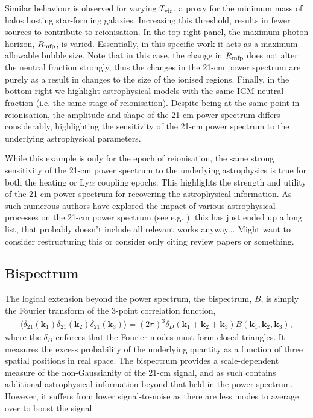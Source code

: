 Similar behaviour is observed for varying $T_{\rm vir}$, a proxy for the minimum mass of halos hosting star-forming galaxies. Increasing this threshold, results in fewer sources to contribute to reionisation. In the top right panel, the maximum photon horizon, $R_{\rm mfp}$, is varied. Essentially, in this specific work it acts as a maximum allowable bubble size. Note that in this case, the change in $R_{\rm mfp}$ does not alter the neutral fraction strongly, thus the changes in the 21-cm power spectrum are purely as a result in changes to the size of the ionised regions. Finally, in the bottom right we highlight astrophysical models with the same IGM neutral fraction (i.e. the same stage of reionisation). Despite being at the same point in reionisation, the amplitude and shape of the 21-cm power spectrum differs considerably, highlighting the sensitivity of the 21-cm power spectrum to the underlying astrophysical parameters. 

While this example is only for the epoch of reionisation, the same strong sensitivity of the 21-cm power spectrum to the underlying astrophysics is true for both the heating or Ly$\alpha$ coupling epochs. This highlights the strength and utility of the 21-cm power spectrum for recovering the astrophysical information. As such numerous authors have explored the impact of various astrophysical processes on the 21-cm power spectrum (see e.g. \cite{Bowman:2006,Furlanetto:2006a,McQuinn:2006,McQuinn:2007,Pritchard:2007,Lidz:2008,Santos:2008,Baek:2010,Harker:2010,Mesinger:2013,Pober:2014,Greig:2015,Mesinger:2016,Greig:2017b,Kern:2017,Hassan:2017,Cohen:2018,Greig:2018,Schmit:2018,Park:2019}). {\color{red} this has just ended up a long list, that probably doesn't include all relevant works anyway... Might want to consider restructuring this or consider only citing review papers or something.}

\subsection{Bispectrum} \label{sec:bispectrum}

The logical extension beyond the power spectrum, the bispectrum, $B$, is simply the Fourier transform of the 3-point correlation function,
\begin{eqnarray}
\langle \delta_{21}(\mathbf{k}_{1})\delta_{21}(\mathbf{k}_{2})\delta_{21}(\mathbf{k}_{3}) \rangle = (2\pi)^{3}\delta_{D}( \mathbf{k}_{1} + \mathbf{k}_{2} + \mathbf{k}_{3})B(\mathbf{k}_{1},\mathbf{k}_{2},\mathbf{k}_{3}),
\end{eqnarray}
where the $\delta_{D}$ enforces that the Fourier modes must form closed triangles. It measures the excess probability of the underlying quantity as a function of three spatial positions in real space. The bispectrum provides a scale-dependent measure of the non-Gaussianity of the 21-cm signal, and as such contains additional astrophysical information beyond that held in the power spectrum. However, it suffers from lower signal-to-noise as there are less modes to average over to boost the signal.

